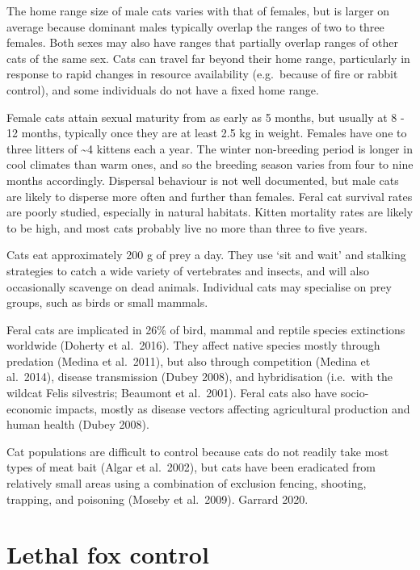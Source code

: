 \documentclass[11pt,a4paper,titlepage,twoside,openright]{style/unimelbthesis}
\begin{document}
\begin{mainmatter}
The home range size of male cats varies with that of females, but is larger on average because dominant males typically overlap the ranges of two to three females. Both sexes may also have ranges that partially overlap ranges of other cats of the same sex. Cats can travel far beyond their home range, particularly in response to rapid changes in resource availability (e.g.~because of fire or rabbit control), and some individuals do not have a fixed home range.

Female cats attain sexual maturity from as early as 5 months, but usually at 8 - 12 months, typically once they are at least 2.5 kg in weight. Females have one to three litters of \textasciitilde4 kittens each a year. The winter non-breeding period is longer in cool climates than warm ones, and so the breeding season varies from four to nine months accordingly. Dispersal behaviour is not well documented, but male cats are likely to disperse more often and further than females.
Feral cat survival rates are poorly studied, especially in natural habitats. Kitten mortality rates are likely to be high, and most cats probably live no more than three to five years.

Cats eat approximately 200 g of prey a day. They use `sit and wait' and stalking strategies to catch a wide variety of vertebrates and insects, and will also occasionally scavenge on dead animals. Individual cats may specialise on prey groups, such as birds or small mammals.

Feral cats are implicated in 26\% of bird, mammal and reptile species extinctions worldwide (Doherty et al.~2016). They affect native species mostly through predation (Medina et al.~2011), but also through competition (Medina et al.~2014), disease transmission (Dubey 2008), and hybridisation (i.e.~with the wildcat Felis silvestris; Beaumont et al.~2001). Feral cats also have socio-economic impacts, mostly as disease vectors affecting agricultural production and human health (Dubey 2008).

Cat populations are difficult to control because cats do not readily take most types of meat bait (Algar et al.~2002), but cats have been eradicated from relatively small areas using a combination of exclusion fencing, shooting, trapping, and poisoning (Moseby et al.~2009).
Garrard 2020.

\hypertarget{lethal-fox-control}{%
\section{Lethal fox control}\label{lethal-fox-control}}


\end{mainmatter}
\end{document}
